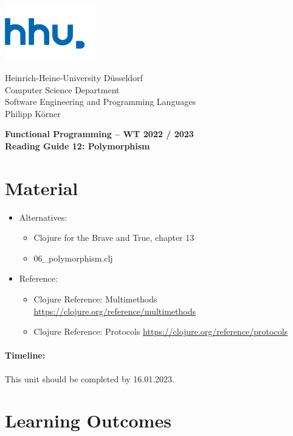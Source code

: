 \documentclass[11pt,a4paper]{article}
\begin{document}
\begin{minipage}[b]{\textwidth}
	\parbox[t]{5cm}{%
		\includegraphics[width=4cm]{unilogo}
		\hfill
	}
	\parbox[b]{11cm}{%
		Heinrich-Heine-University D\"usseldorf\\
		Computer Science Department\\
		Software Engineering and Programming Languages\\
		Philipp K\"orner
	}
\end{minipage}
\begin{center}
	\bf
	Functional Programming -- WT 2022 / 2023\\
	Reading Guide 12: Polymorphism
\end{center}

\pagestyle{empty}

\section{Material} 

\begin{itemize}
    \item Alternatives:
        \begin{itemize}
\item Clojure for the Brave and True, chapter 13
\item 06\_polymorphism.clj
        \end{itemize}
    \item Reference:
        \begin{itemize}
\item Clojure Reference: Multimethods \url{https://clojure.org/reference/multimethods}
\item Clojure Reference: Protocols \url{https://clojure.org/reference/protocols}
        \end{itemize}
\end{itemize}

\paragraph{Timeline:} This unit should be completed by 16.01.2023.


\section{Learning Outcomes}
\end{document}
